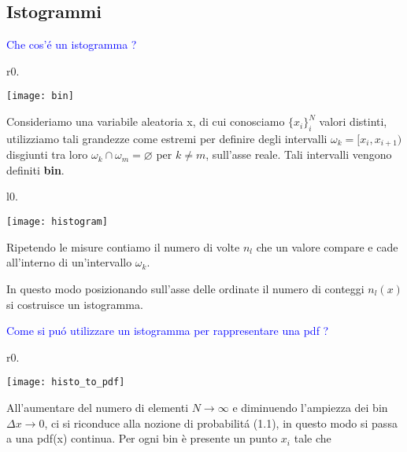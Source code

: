 \documentclass[11pt,a4paper]{book}
\begin{document}
\subsection{Istogrammi}

\textcolor{blue}{Che cos'\'{e} un istogramma ?}\newline


\begin{wrapfigure}{r}{0.\textwidth}
\centering

\texttt{[image: bin]}	

\end{wrapfigure}

Consideriamo una variabile aleatoria x, di cui conosciamo $\{x_i\}_i^N$ valori distinti, utilizziamo tali grandezze come estremi per definire degli intervalli $\omega_{k} = [x_i, x_{i+1}) $ disgiunti tra loro $\omega_{k} \cap \omega_{m} = \varnothing$ per $k \neq m$, sull'asse reale. Tali intervalli vengono definiti \textbf{bin}.

\begin{wrapfigure}[6]{l}{0.\textwidth}

\centering

\texttt{[image: histogram]}	

\end{wrapfigure}

Ripetendo le misure contiamo il numero di volte $n_l$ che un valore compare e cade all'interno di un'intervallo $\omega_k$. 

In questo modo posizionando sull'asse delle ordinate il numero di conteggi $n_l(x)$ si costruisce un istogramma. \newline

\textcolor{blue}{Come si pu\'{o} utilizzare un istogramma per rappresentare una pdf ?}\newline


\begin{wrapfigure}{r}{0.\textwidth}

\centering

\texttt{[image: histo\_to\_pdf]}	

\end{wrapfigure}

All'aumentare del numero di elementi $N \rightarrow \infty$ e diminuendo l'ampiezza dei bin $\Delta x \rightarrow 0 $, ci si riconduce alla nozione di probabilit\'{a} (1.1), in questo modo si passa a una pdf(x) continua.
Per ogni bin \`{e} presente un punto $x_i$ tale che 
\end{document}
